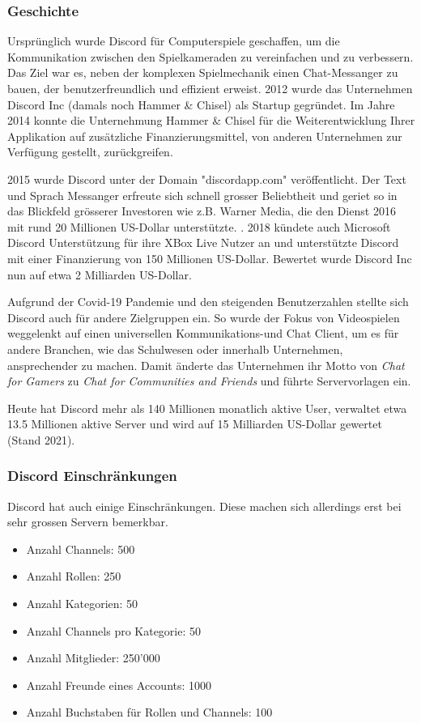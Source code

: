 \documentclass[a4paper, table]{article}
\begin{document}
\subsubsection{Geschichte}
Urspr\"unglich wurde Discord f\"ur Computerspiele geschaffen, um die Kommunikation zwischen den Spielkameraden zu vereinfachen und zu verbessern.
Das Ziel war es, neben der komplexen Spielmechanik einen Chat-Messanger zu bauen, der benutzerfreundlich und effizient erweist.
2012 wurde das Unternehmen Discord Inc (damals noch Hammer \& Chisel)
als Startup gegr\"undet.\autocite{noauthor_discord_2021}
Im Jahre 2014 konnte die Unternehmung Hammer \& Chisel f\"ur die Weiterentwicklung Ihrer
Applikation auf zus\"atzliche Finanzierungsmittel, von anderen Unternehmen zur Verfügung gestellt, zurückgreifen.

2015 wurde Discord unter der Domain "discordapp.com" ver\"offentlicht.
Der Text und Sprach Messanger erfreute sich schnell grosser Beliebtheit
und geriet so in das Blickfeld grösserer Investoren wie z.B. Warner Media, die den Dienst 2016 mit rund
20 Millionen US-Dollar unterstützte. \autocite{noauthor_warner_2022} .
2018 k\"undete auch Microsoft Discord Unterst\"utzung f\"ur ihre XBox Live Nutzer an und unterst\"utzte Discord mit einer Finanzierung
von 150 Millionen US-Dollar. Bewertet wurde Discord Inc nun auf etwa 2 Milliarden US-Dollar.

Aufgrund der Covid-19 Pandemie und den steigenden Benutzerzahlen stellte sich Discord auch f\"ur andere Zielgruppen ein.
So wurde der Fokus von Videospielen weggelenkt auf einen universellen Kommunikations-und Chat Client, um es f\"ur andere Branchen,
wie das Schulwesen oder innerhalb Unternehmen, ansprechender zu machen.
Damit \"anderte das Unternehmen ihr Motto von \textit{Chat for Gamers} zu
\textit{Chat for Communities and Friends} und f\"uhrte Servervorlagen ein.

Heute hat Discord mehr als 140 Millionen monatlich aktive User, verwaltet etwa 13.5 Millionen aktive Server und
wird auf 15 Milliarden US-Dollar gewertet (Stand 2021). \autocite{david_curry_discord_2022}

\subsubsection{Discord Einschr\"ankungen}\label{discord_einschraenkungen}
Discord hat auch einige Einschränkungen.
Diese machen sich allerdings erst bei sehr grossen Servern bemerkbar.\autocite{}
\begin{itemize}
    \item Anzahl Channels: 500
    \item Anzahl Rollen: 250
    \item Anzahl Kategorien: 50
    \item Anzahl Channels pro Kategorie: 50
    \item Anzahl Mitglieder: 250'000
    \item Anzahl Freunde eines Accounts: 1000
    \item Anzahl Buchstaben für Rollen und Channels: 100
\end{itemize}
\end{document}
